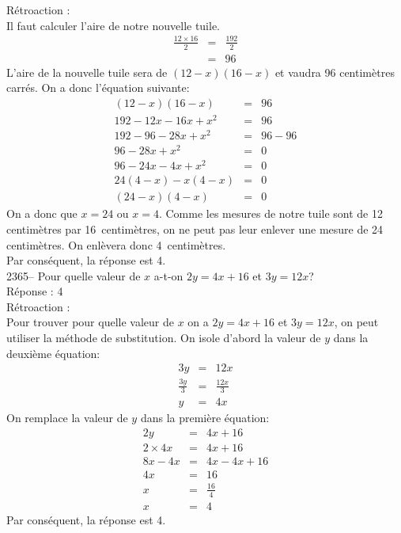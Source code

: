 \documentclass[letterpaper, 12pt]{article}
\begin{document}
R\'etroaction :\\
Il faut calculer l'aire de notre nouvelle tuile.
\begin{eqnarray*}
 \frac{12\times16}{2}&=&\frac{192}{2}\\[2mm]
&=&96
\end{eqnarray*}
L'aire de la nouvelle tuile sera de $(12-x)(16-x)$ et vaudra 96 centim\`etres carr\'es. On a donc l'\'equation suivante:
\begin{eqnarray*}
 (12-x)(16-x)&=&96\\
 192-12x-16x+x^{2}&=&96\\
 192-96-28x+x^{2}&=&96-96\\
 96-28x+x^{2}&=&0\\
96-24x-4x+x^{2}&=&0\\
24(4-x)-x(4-x)&=&0\\
(24-x)(4-x)&=&0
\end{eqnarray*}
On a donc que $x=24$ ou $x=4$. Comme les mesures de notre tuile sont de 12 centim\`etres par \mbox{16 centim\`etres}, on ne peut pas leur enlever une mesure de 24 centim\`etres. On enl\`evera donc \mbox{4 centim\`etres}.\\
Par cons\'equent, la r\'eponse est 4.\\

2365-- Pour quelle valeur de $x$ a-t-on $2y=4x+16$ et $3y=12x$?\\

R\'eponse : 4\\

R\'etroaction :\\
Pour trouver pour quelle valeur de $x$ on a  $2y=4x+16$ et $3y=12x$, on peut utiliser la m\'ethode de substitution. On isole d'abord la valeur de $y$ dans la deuxi\`eme \'equation:
\begin{eqnarray*}
 3y&=&12x\\
 \frac{3y}{3}&=&\frac{12x}{3}\\
y&=&4x
\end{eqnarray*}
On remplace la valeur de $y$ dans la premi\`ere \'equation:
\begin{eqnarray*}
 2y&=&4x+16\\
 2\times 4x&=&4x+16\\
8x-4x&=&4x-4x+16\\
4x&=&16\\[2mm]
x&=&\frac{16}{4}\\[2mm]
x&=&4
\end{eqnarray*}
Par cons\'equent, la r\'eponse est 4.\\
\end{document}
